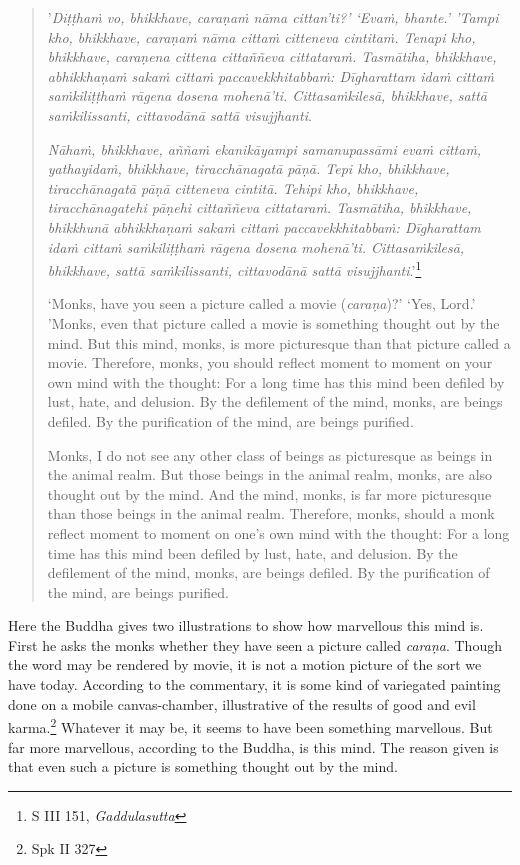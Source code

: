 \begin{quote}
'\emph{Diṭṭhaṁ vo, bhikkhave, caraṇaṁ nāma cittan'ti?' `Evaṁ, bhante.' 'Tampi kho, bhikkhave, caraṇaṁ nāma cittaṁ citteneva cintitaṁ. Tenapi kho, bhikkhave, caraṇena cittena cittaññeva cittataraṁ. Tasmātiha, bhikkhave, abhikkhaṇaṁ sakaṁ cittaṁ paccavekkhitabbaṁ: Dīgharattam idaṁ cittaṁ saṁkiliṭṭhaṁ rāgena dosena mohenā'ti. Cittasaṁkilesā, bhikkhave, sattā saṁkilissanti, cittavodānā sattā visujjhanti}.

\emph{Nāhaṁ, bhikkhave, aññaṁ ekanikāyampi samanupassāmi evaṁ cittaṁ, yathayidaṁ, bhikkhave, tiracchānagatā pāṇā. Tepi kho, bhikkhave, tiracchānagatā pāṇā citteneva cintitā. Tehipi kho, bhikkhave, tiracchānagatehi pāṇehi cittaññeva cittataraṁ. Tasmātiha, bhikkhave, bhikkhunā abhikkhaṇaṁ sakaṁ cittaṁ paccavekkhitabbaṁ: Dīgharattam idaṁ cittaṁ saṁkiliṭṭhaṁ rāgena dosena mohenā'ti. Cittasaṁkilesā, bhikkhave, sattā saṁkilissanti, cittavodānā sattā visujjhanti}.'\footnote{S III 151, \emph{Gaddulasutta}}

`Monks, have you seen a picture called a movie (\emph{caraṇa})?' `Yes, Lord.' 'Monks, even that picture called a movie is something thought out by the mind. But this mind, monks, is more picturesque than that picture called a movie. Therefore, monks, you should reflect moment to moment on your own mind with the thought: For a long time has this mind been defiled by lust, hate, and delusion. By the defilement of the mind, monks, are beings defiled. By the purification of the mind, are beings purified.

Monks, I do not see any other class of beings as picturesque as beings in the animal realm. But those beings in the animal realm, monks, are also thought out by the mind. And the mind, monks, is far more picturesque than those beings in the animal realm. Therefore, monks, should a monk reflect moment to moment on one's own mind with the thought: For a long time has this mind been defiled by lust, hate, and delusion. By the defilement of the mind, monks, are beings defiled. By the purification of the mind, are beings purified.
\end{quote}

Here the Buddha gives two illustrations to show how marvellous this mind is. First he asks the monks whether they have seen a picture called \emph{caraṇa}. Though the word may be rendered by movie, it is not a motion picture of the sort we have today. According to the commentary, it is some kind of variegated painting done on a mobile canvas-chamber, illustrative of the results of good and evil karma.\footnote{Spk II 327} Whatever it may be, it seems to have been something marvellous. But far more marvellous, according to the Buddha, is this mind. The reason given is that even such a picture is something thought out by the mind.

